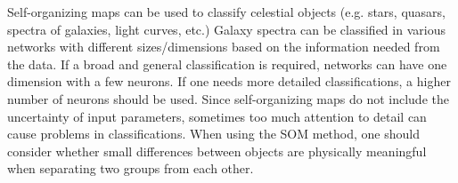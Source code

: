 \documentclass[useAMS,usenatbib]{mn2e}
\begin{document}


Self-organizing maps can be used to classify celestial objects (e.g. stars, quasars, spectra of galaxies, light curves, etc.)
Galaxy spectra can be classified in various networks with different sizes/dimensions based on the information needed from the data. 
If a broad and general classification is required, networks can have one dimension with a few neurons.
If one needs more detailed classifications, a higher number of neurons should be used.
Since self-organizing maps do not include the uncertainty of input parameters, sometimes too much attention to detail can cause problems in classifications. 
When using the SOM method, one should consider whether small differences between objects are physically meaningful when separating two groups from each other.
\end{document}
